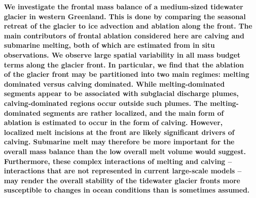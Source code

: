\documentclass[30pt,letterpaper]{article}
\begin{document}
{\sf \textbf{\small{
We investigate the frontal mass balance of a medium-sized tidewater glacier in western Greenland. This is done by comparing the seasonal retreat of the glacier to ice advection and ablation along the front. The main contributors of frontal ablation considered here are calving and submarine melting, both of which are estimated from in situ observations.  We observe large spatial variability in all mass budget terms along the glacier front. 
In particular, we find that the ablation of the glacier front may be partitioned into two main regimes: melting dominated versus calving dominated. While melting-dominated segments appear to be associated with subglacial discharge plumes, calving-dominated regions occur outside such plumes. The melting-dominated segments are rather localized, and the main form of ablation is estimated to occur in the form of calving. However, localized melt incisions at the front are likely significant drivers of calving. Submarine melt may therefore be more important for the overall mass balance than the low overall melt volume would suggest. Furthermore, these complex interactions of melting and calving -- interactions that are not represented in current large-scale models -- may render the overall stability of the tidewater glacier fronts more susceptible to changes in ocean conditions than is sometimes assumed.
}}}
\vspace*{.05in}
\end{document}

